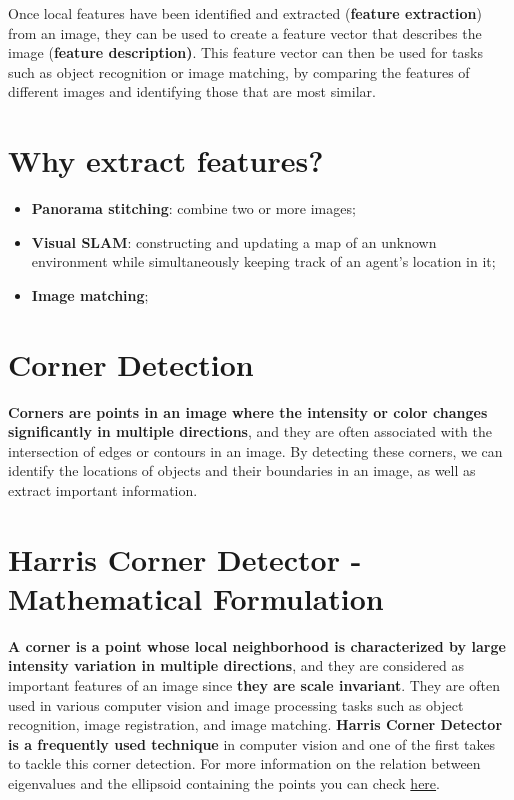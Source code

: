 \documentclass{article}
\begin{document}
Once local features have been identified and extracted (\textbf{feature extraction}) from an image, they can be used to create a feature vector that describes the image (\textbf{feature description)}. This feature vector can then be used for tasks such as object recognition or image matching, by comparing the features of different images and identifying those that are most similar.

\section*{Why extract features?}

\begin{itemize}
    \item \textbf{Panorama stitching}: combine two or more images;
    \item \textbf{Visual SLAM}: constructing and updating a map of an unknown environment while simultaneously keeping track of an agent's location in it;
    \item \textbf{Image matching};
\end{itemize}

\section*{Corner Detection}

\textbf{Corners are points in an image where the intensity or color changes significantly in multiple directions}, and they are often associated with the intersection of edges or contours in an image. By detecting these corners, we can identify the locations of objects and their boundaries in an image, as well as extract important information.

\newpage

\section*{Harris Corner Detector - Mathematical Formulation}

\textbf{A corner is a point whose local neighborhood is characterized by large intensity variation in multiple directions}, and they are considered as important features of an image since \textbf{they are scale invariant}. They are often used in various computer vision and image processing tasks such as object recognition, image registration, and image matching. \textbf{Harris Corner Detector is a frequently used technique} in computer vision and one of the first takes to tackle this corner detection. For more information on the relation between eigenvalues and the ellipsoid containing the points you can check \href{https://guangchun.wordpress.com/2013/02/16/harris-detector/}{here}. \\
\end{document}
